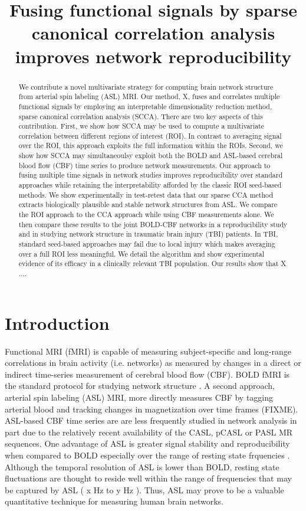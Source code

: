 \documentclass{llncs}
\title{Fusing functional signals by sparse canonical correlation analysis improves network reproducibility}
\begin{document}
\maketitle
\begin{abstract}
We contribute a novel multivariate strategy for computing brain network structure from arterial spin labeling (ASL) MRI.  Our method, X, fuses and correlates multiple functional signals by employing an interpretable dimensionality reduction method, sparse canonical correlation analysis (SCCA).  There are two key aspects of this contribution.  First, we show how SCCA may be used to compute a multivariate correlation between different regions of interest (ROI).  In contrast to averaging signal over the ROI, this approach exploits the full information within the ROIs.  Second, we show how SCCA may simultaneoulsy exploit both the BOLD and ASL-based cerebral blood flow (CBF) time series to produce network measurements.  Our approach to fusing multiple time signals in network studies improves reproducibility over standard approaches while retaining the interpretability afforded by the classic ROI seed-based methods.  We show experimentally in test-retest data that our sparse CCA method extracts biologically plausible and stable network structures from ASL.  We compare the ROI approach to the CCA approach while using CBF measurements alone.  We then compare these results to the joint BOLD-CBF networks in a reproducibility study and in studying network structure in traumatic brain injury (TBI) patients.  In TBI, standard seed-based approaches may fail due to local injury which makes averaging over a full ROI less meaningful.  We detail the algorithm and show experimental evidence of its efficacy in a clinically relevant TBI population.  Our results show that X ....  
\end{abstract}

\section*{Introduction}
Functional MRI (fMRI) is capable of measuring subject-specific and long-range correlations in brain activity (i.e. networks) as measured by changes in a direct or indirect time-series measurement of cerebral blood flow (CBF).  BOLD fMRI is the standard protocol for studying network structure \cite{}.  A second approach, arterial spin labeling (ASL) MRI, more directly measures CBF by tagging arterial blood and tracking changes in magnetization over time frames (FIXME).  ASL-based CBF time series are are less frequently studied in network analysis in part due to the relatively recent availability of the CASL, pCASL or PASL MR sequences.  One advantage of ASL is greater signal stability and reproducibility when compared to BOLD especially over the range of resting state frquencies \cite{Aguirre paper}.  Although the temporal resolution of ASL is lower than BOLD, resting state fluctuations are thought to reside well within the range of frequencies that may be captured by ASL ( x Hz to y Hz ).  Thus, ASL may prove to be a valuable quantitative technique for measuring human brain networks.
\cite{Implementation of Quantitative Perfusion Imaging Techniques for Functional Brain Mapping using Pulsed Arterial Spin Labeling}
\end{document}
